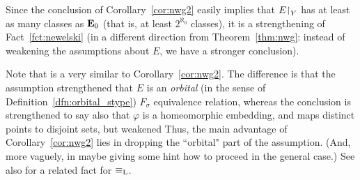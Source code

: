 	Since the conclusion of Corollary~\ref{cor:nwg2} easily implies that $E\mathord{\upharpoonright}_Y$ has at least as many classes as $\mathrel{ { {\mathbf E}_0 } }$ (that is, at least $2^{\aleph_0}$ classes), it is a strengthening of Fact~\ref{fct:newelski} (in a different direction from Theorem~\ref{thm:nwg}: instead of weakening the assumptions about $E$, we have a stronger conclusion).
	
	Note that \cite[Theorem 3.18]{KR16} is a very similar to Corollary~\ref{cor:nwg2}. The difference is that the assumption strengthened that $E$ is an \emph{orbital} (in the sense of Definition~\ref{dfn:orbital_stype}) $F_\sigma$ equivalence relation, whereas the conclusion is strengthened to say also that $\varphi$ is a homeomorphic embedding, and maps distinct points to disjoint sets, but weakened  Thus, the main advantage of Corollary~\ref{cor:nwg2} lies in dropping the ``orbital" part of the assumption. (And, more vaguely, in maybe giving some hint how to proceed in the general case.) See also \cite[Theorem 5.1]{KMS14} for a related fact for $\equiv_{\mathrm{L}}$.
	
